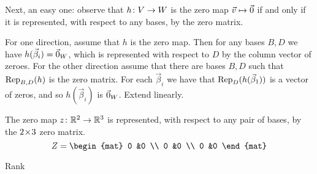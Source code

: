 \documentclass[10pt,t]{beamer}
\begin{document}
\begin{frame}
Next, an easy one: 
observe that $\map{h}{V}{W}$ is the zero map $\vec{v}\mapsto\zero$
if and only
if it is represented, with respect to any bases, by the zero matrix.

\pause
For one direction, assume that $h$ is the zero map.
Then for any bases $B,D$ we have $h(\vec{\beta}_i)=\zero_W$, which is 
represented with respect to $D$ by the column vector of zeroes.
% 
For the other direction 
assume that there are bases $B,D$ such that $\rep{h}{B,D}$ is the zero
matrix.
For each $\vec{\beta}_i$ we have that $\rep{h(\vec{\beta}_1)}{D}$ is a
vector of zeros, and so $h(\vec{\beta}_i)$ is $\zero_W$.
Extend linearly.

\pause
\ex The zero map $\map{z}{\Re^2}{\Re^3}$ is represented, 
with respect to any pair of bases,
by the $\nbym{2}{3}$
zero matrix.
\begin{equation*}
  Z=
  \begin{mat}
    0 &0 \\
    0 &0 \\
    0 &0
  \end{mat}
\end{equation*}

\end{frame}




\begin{frame}{Rank}
\th[th:RankMatEqRankMap]
\iftoggle{showallproofs}{
  \pause
  \pf
  \ExecuteMetaData[../map3.tex]{pf:RankMatEqRankMap0}

  \pause
  \ExecuteMetaData[../map3.tex]{pf:RankMatEqRankMap1}
}{

  \bigskip
  The book has the proof.
  We will instead do an example.
}
\end{frame}
\iftoggle{showallproofs}{
  \begin{frame}
  \ExecuteMetaData[../map3.tex]{pf:RankMatEqRankMap2}
  \qed
  \end{frame}
}{}
\end{document}
